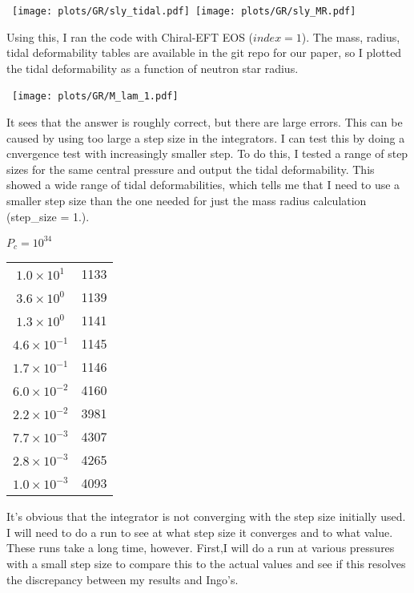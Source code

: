 \documentclass[11pt]{article}
\numberwithin{equation}{section}
\begin{document}
\begin{center}
\hbox{
\texttt{[image: plots/GR/sly\_tidal.pdf]}
\texttt{[image: plots/GR/sly\_MR.pdf]}}
\end{center}

Using this, I ran the code with Chiral-EFT EOS ($index=1$). The mass, radius, tidal deformability tables are available in the git repo for our paper, so I plotted the tidal deformability as a function of neutron star radius.

\begin{center}
\hbox{
\texttt{[image: plots/GR/M\_lam\_1.pdf]}}
\end{center}

It sees that the answer is roughly correct, but there are large errors.  This can be caused by using too large a step size in the integrators.  I can test this by doing a cnvergence test with increasingly smaller step.  To do this, I tested a range of step sizes for the same central pressure and output the tidal deformability.  This showed a wide range of tidal deformabilities, which tells me that I need to use a smaller step size than the one needed for just the mass radius calculation (step\_size = 1.).  

$P_{c} = 10^{34}$
\begin{tabular}{|c | c|} \hline
$1.0 \times 10^1$ & 1133 \\ 
$3.6 \times 10^0$ & 1139 \\
$1.3 \times 10^0$ & 1141 \\
$4.6 \times 10^{-1}$ &  1145 \\
$1.7 \times 10^{-1}$ & 1146 \\
$6.0 \times 10^{-2}$ & 4160 \\ 
$2.2 \times 10^{-2}$ & 3981 \\
$7.7 \times 10^{-3}$ & 4307 \\ 
$2.8 \times 10^{-3}$ & 4265 \\
$1.0 \times 10^{-3}$ & 4093  \\
\hline
\end{tabular}

It's obvious that the integrator is not converging with the step size initially used.  I will need to do a run to see at what step size it converges and to what value.  These runs take a long time, however. First,I will do a run at various pressures with a small step size to compare this to the actual values and see if this resolves the discrepancy between my results and Ingo's. 
\end{document}
